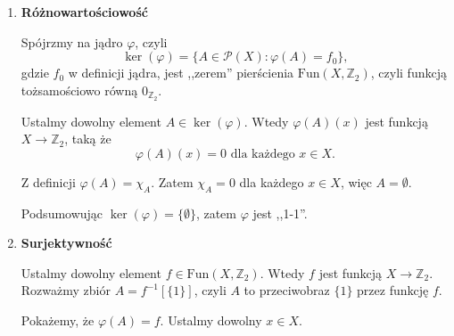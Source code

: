 \begin{solution}
\begin{enumerate}[label=\alph*)]
\begin{enumerate}[label=\arabic*)]
\begin{enumerate}[label=\alph*)]
						Dla różnicy symetrycznej:
						\[
							L = \varphi \left( A \Delta B \right) \left( x \right) = \chi_{A \Delta B}\left( x \right) = 0 = 0 + 0 = \chi_{A}\left( x \right)  + \chi_{B}\left( x \right) = \varphi\left( A \right) \left( x \right) + \varphi \left( B \right) \left( x \right) = P 
						.\]

						Dla przekroju:
						\[
						L = \varphi \left( A \cap B \right) \left( x \right) = \chi_{A \cap B} = 0 = 0 \cdot 0 = \chi_{A}\left( x \right) \cdot \chi_{B}\left( x \right) = \varphi\left( A \right) \left( x \right) \cdot \varphi \left( B \right) \left( x \right) = P  
						.\] 

				\end{enumerate}
			\item \textbf{Różnowartościowość}  

				Spójrzmy na jądro $\varphi  $, czyli
				\[
				\ker(\varphi) = \{A \in \mathcal{P}(X) : \varphi\left( A \right) = f_{0} \}  
				,\] 
				gdzie $f_{0}$ w definicji jądra, jest ,,zerem'' pierścienia $\text{Fun}\left( X, \mathbb{Z} _{2} \right) $, czyli funkcją tożsamościowo równą $0_{\scriptscriptstyle \mathbb{Z}_{2}}$. 

				Ustalmy dowolny element $A \in \ker(\varphi  ) $. Wtedy  $\varphi \left( A \right) \left( x \right)  $ jest funkcją $X\to \mathbb{Z}_{2}$, taką że \[
				\varphi \left( A \right) \left( x \right) = 0 \text{ dla każdego } x \in X 
				.\] 

				Z definicji $\varphi\left( A \right)  = \chi_{A}$. Zatem $\chi_{A} = 0$ dla każdego  $x \in X$, więc $A = \emptyset $. 

				Podsumowując $\ker(\varphi  ) = \{\emptyset \} $, zatem $\varphi  $ jest ,,1-1''.
			\item \textbf{Surjektywność} 

				Ustalmy dowolny element $f \in \text{Fun}\left( X, \mathbb{Z}_{2} \right) $. Wtedy $f$ jest funkcją $X \to \mathbb{Z}_{2}$. Rozważmy zbiór $A = f^{-1}\left[ \{1\}  \right]$, czyli $A$ to przeciwobraz $\{1\} $ przez funkcję $f$.

				Pokażemy, że $\varphi \left( A \right) = f $. 	Ustalmy dowolny $x \in X$. 


\end{enumerate}
\end{enumerate}
\end{solution}
